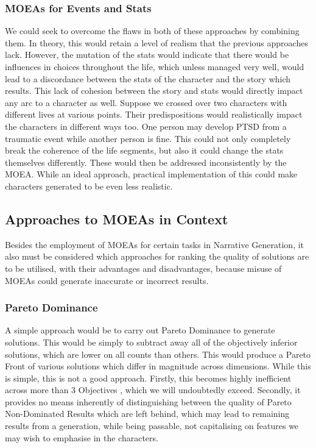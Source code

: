 \documentclass[12pt]{article}
\begin{document}
\subsubsection{MOEAs for Events and Stats} 
We could seek to overcome the flaws in both of these approaches by combining them. In theory, this would retain a level of realism that the previous approaches lack. However, the mutation of the stats would indicate that there would be influences in choices throughout the life, which unless managed very well, would lead to a discordance between the stats of the character and the story which results. This lack of cohesion between the story and stats would directly impact any arc to a character as well. Suppose we crossed over two characters with different lives at various points. Their predispositions would realistically impact the characters in different ways too. One person may develop PTSD from a traumatic event while another person is fine. This could not only completely break the coherence of the life segments, but also it could change the stats themselves differently. These would then be addressed inconsistently by the MOEA. While an ideal approach, practical implementation of this could make characters generated to be even less realistic. \\

\subsection{Approaches to MOEAs in Context}
Besides the employment of MOEAs for certain tasks in Narrative Generation, it also must be considered which approaches for ranking the quality of solutions are to be utilised, with their advantages and disadvantages, because misuse of MOEAs could generate inaccurate or incorrect results.
\subsubsection{Pareto Dominance}
A simple approach would be to carry out Pareto Dominance to generate solutions. This would be simply to subtract away all of the objectively inferior solutions, which are lower on all counts than others. This would produce a Pareto Front of various solutions which differ in magnitude across dimensions. While this is simple, this is not a good approach. Firstly, this becomes highly inefficient across more than 3 Objectives \cite{AchievementScalarazingIndicatorBased}, which we will undoubtedly exceed. Secondly, it provides no means inherently of distinguishing between the quality of Pareto Non-Dominated Results which are left behind, which may lead to remaining results from a generation, while being passable, not capitalising on features we may wish to emphasise in the characters.  
\end{document}

